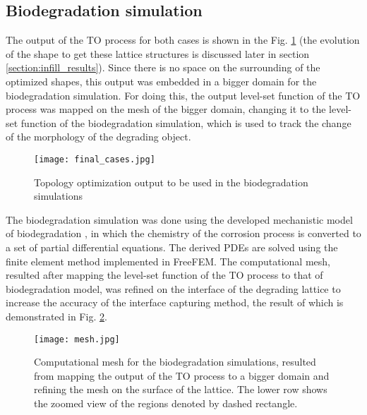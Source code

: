 \subsection{Biodegradation simulation}\label{section:biodegradation}

The output of the TO process for both cases is shown in the Fig. \ref{fig:infill_final_cases} (the evolution of the shape to get these lattice structures is discussed later in section \ref{section:infill_results}). Since there is no space on the surrounding of the optimized shapes, this output was embedded in a bigger domain for the biodegradation simulation. For doing this, the output level-set function of the TO process was mapped on the mesh of the bigger domain, changing it to the level-set function of the biodegradation simulation, which is used to track the change of the morphology of the degrading object. 

\begin{figure}[h]
\centering
\medskip
\texttt{[image: final\_cases.jpg]}
\caption[Topology optimization output to be used in the biodegradation simulations]{Topology optimization output to be used in the biodegradation simulations} \label{fig:infill_final_cases}
\end{figure}

The biodegradation simulation was done using the developed mechanistic model of biodegradation \cite{Barzegari2021}, in which the chemistry of the corrosion process is converted to a set of partial differential equations. The derived PDEs are solved using the finite element method implemented in FreeFEM. The computational mesh, resulted after mapping the level-set function of the TO process to that of biodegradation model, was refined on the interface of the degrading lattice to increase the accuracy of the interface capturing method, the result of which is demonstrated in Fig. \ref{fig:infill_mesh}.


\begin{figure}[h]
\centering
\medskip
\texttt{[image: mesh.jpg]}
\caption[Computational mesh for the biodegradation simulations]{Computational mesh for the biodegradation simulations, resulted from mapping the output of the TO process to a bigger domain and refining the mesh on the surface of the lattice. The lower row shows the zoomed view of the regions denoted by dashed rectangle.} \label{fig:infill_mesh}
\end{figure}



